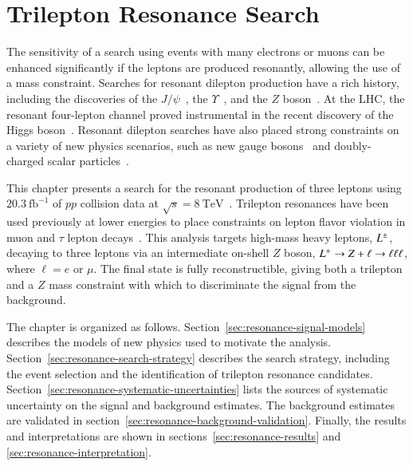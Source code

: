 \chapter{Trilepton Resonance Search}\label{ch:trilepton-resonance-search}
The sensitivity of a search using events with many electrons or muons can be enhanced significantly if the leptons are produced resonantly, allowing the use of a mass constraint. Searches for resonant dilepton production have a rich history, including the discoveries of the $J/\psi$~\cite{jpsi1,jpsi2}, the $\Upsilon$~\cite{upsilon}, and the $Z$ boson~\cite{zua1}. At the LHC, the resonant four-lepton channel proved instrumental in the recent discovery of the Higgs boson~\cite{TheATLASCollaboration:2012cp,TheCMSCollaboration:2012dl}. Resonant dilepton searches have also placed strong constraints on a variety of new physics scenarios, such as new gauge bosons~\cite{TheATLASCollaboration:2014eb,TheCMSCollaboration:2015fm} and doubly-charged scalar particles~\cite{TheATLASCollaboration:2015gu}. 

This chapter presents a search for the resonant production of three leptons using $20.3~\mbox{fb}^{-1}$ of $pp$ collision data at $\sqrt{s}=8~\mbox{TeV}$~\cite{trileptonresonance}. Trilepton resonances have been used previously at lower energies to place constraints on lepton flavor violation in muon and $\tau$ lepton decays~\cite{Bellgardt:1987du,taulll}. This analysis targets high-mass heavy leptons, $L^{\pm}$, decaying to three leptons via an intermediate on-shell $Z$ boson, $L^{\pm} \rightarrow Z+\ell \rightarrow \ell\ell\ell$, where $\ell=e$ or $\mu$. The final state is fully reconstructible, giving both a trilepton and a $Z$ mass constraint with which to discriminate the signal from the background.

The chapter is organized as follows. Section~\ref{sec:resonance-signal-models} describes the models of new physics used to motivate the analysis. Section~\ref{sec:resonance-search-strategy} describes the search strategy, including the event selection and the identification of trilepton resonance candidates. Section~\ref{sec:resonance-systematic-uncertainties} lists the sources of systematic uncertainty on the signal and background estimates. The background estimates are validated in section~\ref{sec:resonance-background-validation}. Finally, the results and interpretations are shown in sections~\ref{sec:resonance-results} and \ref{sec:resonance-interpretation}. 


